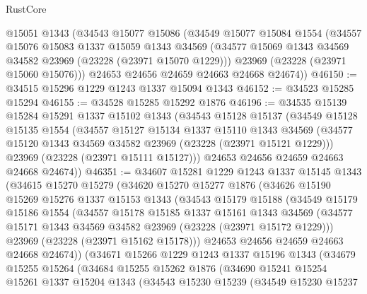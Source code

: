 \begin{lexlean}{RustCore}
\begin{coremodule}
    @15051
    @1343
    (@34543
      @15077
      @15086
      (@34549
        @15077
        @15084
        @1554
        (@34557
          @15076
          @15083
          @1337
          @15059
          @1343
          @34569
          (@34577 @15069 @1343 @34569 @34582 @23969 (@23228 (@23971 @15070 @1229)))
          @23969
          (@23228 (@23971 @15060 @15076)))
        @24653
        @24656
        @24659
        @24663
        @24668
        @24674))
@46150 := @34515 @15296 @1229 @1243 @1337 @15094 @1343
@46152 := @34523 @15285 @15294
@46155 := @34528 @15285 @15292 @1876
@46196 := @34535
    @15139
    @15284
    @15291
    @1337
    @15102
    @1343
    (@34543
      @15128
      @15137
      (@34549
        @15128
        @15135
        @1554
        (@34557
          @15127
          @15134
          @1337
          @15110
          @1343
          @34569
          (@34577 @15120 @1343 @34569 @34582 @23969 (@23228 (@23971 @15121 @1229)))
          @23969
          (@23228 (@23971 @15111 @15127)))
        @24653
        @24656
        @24659
        @24663
        @24668
        @24674))
@46351 := @34607
    @15281
    @1229
    @1243
    @1337
    @15145
    @1343
    (@34615
      @15270
      @15279
      (@34620
        @15270
        @15277
        @1876
        (@34626
          @15190
          @15269
          @15276
          @1337
          @15153
          @1343
          (@34543
            @15179
            @15188
            (@34549
              @15179
              @15186
              @1554
              (@34557
                @15178
                @15185
                @1337
                @15161
                @1343
                @34569
                (@34577 @15171 @1343 @34569 @34582 @23969 (@23228 (@23971 @15172 @1229)))
                @23969
                (@23228 (@23971 @15162 @15178)))
              @24653
              @24656
              @24659
              @24663
              @24668
              @24674))
          (@34671
            @15266
            @1229
            @1243
            @1337
            @15196
            @1343
            (@34679
              @15255
              @15264
              (@34684
                @15255
                @15262
                @1876
                (@34690
                  @15241
                  @15254
                  @15261
                  @1337
                  @15204
                  @1343
                  (@34543
                    @15230
                    @15239
                    (@34549
                      @15230
                      @15237

\end{coremodule}
\end{lexlean}

